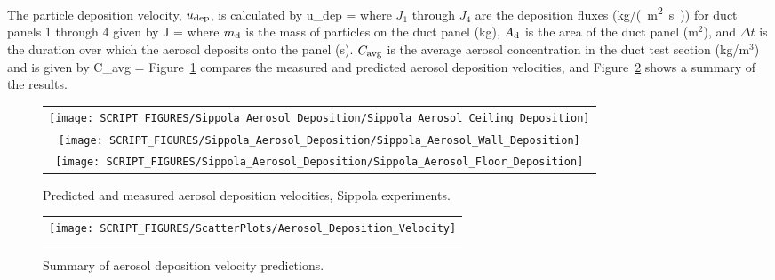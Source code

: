 \noindent The particle deposition velocity, $u_{\rm dep}$, is calculated by
\be
   u_{\rm dep} = 
\ee
where $J_1$ through $J_4$ are the deposition fluxes (\si{kg/(m^2.s)}) for duct panels 1 through 4 given by
\be
   J = 
\ee
where $m_{\rm d}$ is the mass of particles on the duct panel (kg), $A_{\rm d}$ is the area of the duct panel (m$^2$),
and $\Delta t$ is the duration over which the aerosol deposits onto the panel (s). $C_{\rm avg}$ is the
average aerosol concentration in the duct test section (kg/m$^3$) and is given by
\be
   C_{\rm avg} = 
\ee
Figure~\ref{Sippola_Aerosol_Deposition_Velocity} compares the measured and predicted aerosol deposition velocities,
and Figure~\ref{Summary_Aerosol_Deposition_Velocity} shows a summary of the results.

\begin{figure}[ht]
\begin{center}
\begin{tabular}{c}
\texttt{[image: SCRIPT\_FIGURES/Sippola\_Aerosol\_Deposition/Sippola\_Aerosol\_Ceiling\_Deposition]} \\
\texttt{[image: SCRIPT\_FIGURES/Sippola\_Aerosol\_Deposition/Sippola\_Aerosol\_Wall\_Deposition]} \\
\texttt{[image: SCRIPT\_FIGURES/Sippola\_Aerosol\_Deposition/Sippola\_Aerosol\_Floor\_Deposition]}
\end{tabular}
\end{center}
\caption[Predicted and measured aerosol deposition velocities, Sippola experiments]
{Predicted and measured aerosol deposition velocities, Sippola experiments.}
\label{Sippola_Aerosol_Deposition_Velocity}
\end{figure}

\begin{figure}[ht]
\begin{center}
\begin{tabular}{c}
\texttt{[image: SCRIPT\_FIGURES/ScatterPlots/Aerosol\_Deposition\_Velocity]} \\
\vspace{0.25in} \\
\end{tabular}
\end{center}
\caption[Summary of aerosol deposition velocity predictions]
{Summary of aerosol deposition velocity predictions.}
\label{Summary_Aerosol_Deposition_Velocity}
\end{figure}


